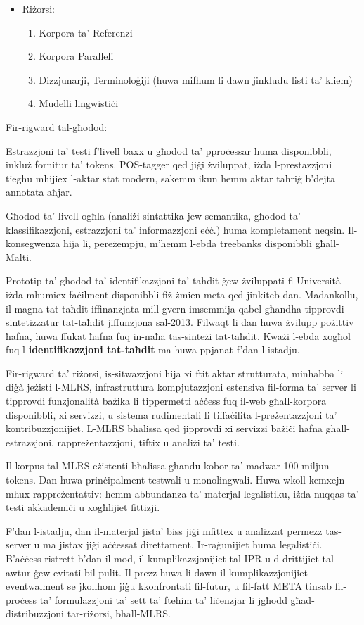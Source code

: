 \begin{multicols}{2}
\begin{itemize}
\item Riżorsi: 
  \begin{enumerate}
  \item Korpora ta’ Referenzi 
  \item Korpora Paralleli 
  \item Dizzjunarji, Terminoloġiji (huwa mifhum li dawn jinkludu listi ta’ kliem) 
  \item Mudelli lingwistiċi 
  \end{enumerate}
\end{itemize}

Fir-rigward tal-għodod:

Estrazzjoni ta’ testi f’livell baxx u għodod ta’ pproċessar huma disponibbli, inkluż fornitur ta’ tokens. POS-tagger qed jiġi żviluppat, iżda l-prestazzjoni tiegħu mhijiex l-aktar stat modern, sakemm ikun hemm aktar taħriġ b’dejta annotata aħjar.

Għodod ta’ livell ogħla (analiżi sintattika jew semantika, għodod ta’ klassifikazzjoni, estrazzjoni ta’ informazzjoni eċċ.) huma kompletament neqsin. Il-konsegwenza hija li, pereżempju, m’hemm l-ebda treebanks disponibbli għall-Malti.

Prototip ta’ għodod ta’ identifikazzjoni ta’ taħdit ġew żviluppati fl-Università iżda mhumiex faċilment disponibbli fiż-żmien meta qed jinkiteb dan. Madankollu, il-magna tat-taħdit iffinanzjata mill-gvern imsemmija qabel għandha tipprovdi sintetizzatur tat-taħdit jiffunzjona sal-2013. Filwaqt li dan huwa żvilupp pożittiv ħafna, huwa ffukat ħafna fuq in-naħa tas-sinteżi tat-taħdit. Kważi l-ebda xogħol fuq l-\textbf{identifikazzjoni tat-taħdit} ma huwa ppjanat f'dan l-istadju.

Fir-rigward ta’ riżorsi, is-sitwazzjoni hija xi ftit aktar strutturata, minħabba li diġà jeżisti l-MLRS, infrastruttura kompjutazzjoni estensiva fil-forma ta’ server li tipprovdi funzjonalità bażika li tippermetti aċċess fuq il-web għall-korpora disponibbli, xi servizzi, u sistema rudimentali li tiffaċilita l-preżentazzjoni ta’ kontribuzzjonijiet. L-MLRS bħalissa qed jipprovdi xi servizzi bażiċi ħafna għall-estrazzjoni, rappreżentazzjoni, tiftix u analiżi ta’ testi.

Il-korpus tal-MLRS eżistenti bħalissa għandu kobor ta’ madwar 100 miljun tokens. Dan huwa prinċipalment testwali u monolingwali. Huwa wkoll kemxejn mhux rappreżentattiv: hemm abbundanza ta’ materjal legalistiku, iżda nuqqas ta’ testi akkademiċi u xogħlijiet fittizji.

F'dan l-istadju, dan il-materjal jista’ biss jiġi mfittex u analizzat permezz tas-server u ma jistax jiġi aċċessat direttament. Ir-raġunijiet huma legalistiċi. B’aċċess ristrett b’dan il-mod, il-kumplikazzjonijiet tal-IPR u d-drittijiet tal-awtur ġew evitati bil-pulit. Il-prezz huwa li dawn il-kumplikazzjonijiet eventwalment se jkollhom jiġu kkonfrontati fil-futur, u fil-fatt META tinsab fil-proċess ta’ formulazzjoni ta’ sett ta’ ftehim ta’ liċenzjar li jgħodd għad-distribuzzjoni tar-riżorsi, bħall-MLRS.


\end{multicols}
